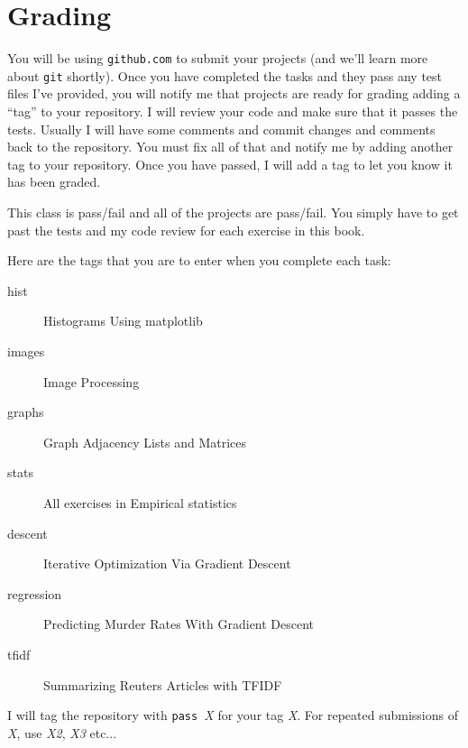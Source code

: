 \chapter{Grading}

You will be using {\tt github.com} to submit your projects (and we'll learn more about {\tt git} shortly).  Once you have completed the tasks and they pass any test files I've provided, you will notify me that projects are ready for grading adding a ``tag'' to your repository.  I will review your code and make sure that it passes the tests. Usually I will have some comments and commit changes and comments back to the repository. You must fix all of that and notify me by adding another tag to your repository. Once you have passed, I will add a tag to let you know it has been graded.

This class is pass/fail and all of the projects are pass/fail. You simply have to get past the tests and my code review for each exercise in this book.

Here are the tags that you are to enter when you complete each task:

\begin{description}
\item[hist] Histograms Using matplotlib
\item[images] Image Processing
\item[graphs] Graph Adjacency Lists and Matrices
\item[stats] All exercises in Empirical statistics
\item[descent] Iterative Optimization Via Gradient Descent
\item[regression] Predicting Murder Rates With Gradient Descent
\item[tfidf] Summarizing Reuters Articles with TFIDF
\end{description}

I will tag the repository with {\tt pass }{\em X} for your tag {\em X}. For repeated submissions of {\em X}, use {\em X2}, {\em X3} etc...